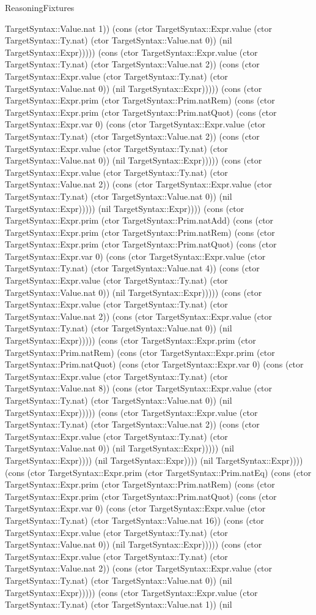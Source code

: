 \begin{lexlean}{ReasoningFixtures}
\begin{semanticmodule}
{TargetSyntax::Value.nat 1)) (cons (ctor TargetSyntax::Expr.value (ctor TargetSyntax::Ty.nat) (ctor TargetSyntax::Value.nat 0)) (nil TargetSyntax::Expr))))) (cons (ctor TargetSyntax::Expr.value (ctor TargetSyntax::Ty.nat) (ctor TargetSyntax::Value.nat 2)) (cons (ctor TargetSyntax::Expr.value (ctor TargetSyntax::Ty.nat) (ctor TargetSyntax::Value.nat 0)) (nil TargetSyntax::Expr))))) (cons (ctor TargetSyntax::Expr.prim (ctor TargetSyntax::Prim.natRem) (cons (ctor TargetSyntax::Expr.prim (ctor TargetSyntax::Prim.natQuot) (cons (ctor TargetSyntax::Expr.var 0) (cons (ctor TargetSyntax::Expr.value (ctor TargetSyntax::Ty.nat) (ctor TargetSyntax::Value.nat 2)) (cons (ctor TargetSyntax::Expr.value (ctor TargetSyntax::Ty.nat) (ctor TargetSyntax::Value.nat 0)) (nil TargetSyntax::Expr))))) (cons (ctor TargetSyntax::Expr.value (ctor TargetSyntax::Ty.nat) (ctor TargetSyntax::Value.nat 2)) (cons (ctor TargetSyntax::Expr.value (ctor TargetSyntax::Ty.nat) (ctor TargetSyntax::Value.nat 0)) (nil TargetSyntax::Expr))))) (nil TargetSyntax::Expr)))) (cons (ctor TargetSyntax::Expr.prim (ctor TargetSyntax::Prim.natAdd) (cons (ctor TargetSyntax::Expr.prim (ctor TargetSyntax::Prim.natRem) (cons (ctor TargetSyntax::Expr.prim (ctor TargetSyntax::Prim.natQuot) (cons (ctor TargetSyntax::Expr.var 0) (cons (ctor TargetSyntax::Expr.value (ctor TargetSyntax::Ty.nat) (ctor TargetSyntax::Value.nat 4)) (cons (ctor TargetSyntax::Expr.value (ctor TargetSyntax::Ty.nat) (ctor TargetSyntax::Value.nat 0)) (nil TargetSyntax::Expr))))) (cons (ctor TargetSyntax::Expr.value (ctor TargetSyntax::Ty.nat) (ctor TargetSyntax::Value.nat 2)) (cons (ctor TargetSyntax::Expr.value (ctor TargetSyntax::Ty.nat) (ctor TargetSyntax::Value.nat 0)) (nil TargetSyntax::Expr))))) (cons (ctor TargetSyntax::Expr.prim (ctor TargetSyntax::Prim.natRem) (cons (ctor TargetSyntax::Expr.prim (ctor TargetSyntax::Prim.natQuot) (cons (ctor TargetSyntax::Expr.var 0) (cons (ctor TargetSyntax::Expr.value (ctor TargetSyntax::Ty.nat) (ctor TargetSyntax::Value.nat 8)) (cons (ctor TargetSyntax::Expr.value (ctor TargetSyntax::Ty.nat) (ctor TargetSyntax::Value.nat 0)) (nil TargetSyntax::Expr))))) (cons (ctor TargetSyntax::Expr.value (ctor TargetSyntax::Ty.nat) (ctor TargetSyntax::Value.nat 2)) (cons (ctor TargetSyntax::Expr.value (ctor TargetSyntax::Ty.nat) (ctor TargetSyntax::Value.nat 0)) (nil TargetSyntax::Expr))))) (nil TargetSyntax::Expr)))) (nil TargetSyntax::Expr)))) (nil TargetSyntax::Expr)))) (cons (ctor TargetSyntax::Expr.prim (ctor TargetSyntax::Prim.natEq) (cons (ctor TargetSyntax::Expr.prim (ctor TargetSyntax::Prim.natRem) (cons (ctor TargetSyntax::Expr.prim (ctor TargetSyntax::Prim.natQuot) (cons (ctor TargetSyntax::Expr.var 0) (cons (ctor TargetSyntax::Expr.value (ctor TargetSyntax::Ty.nat) (ctor TargetSyntax::Value.nat 16)) (cons (ctor TargetSyntax::Expr.value (ctor TargetSyntax::Ty.nat) (ctor TargetSyntax::Value.nat 0)) (nil TargetSyntax::Expr))))) (cons (ctor TargetSyntax::Expr.value (ctor TargetSyntax::Ty.nat) (ctor TargetSyntax::Value.nat 2)) (cons (ctor TargetSyntax::Expr.value (ctor TargetSyntax::Ty.nat) (ctor TargetSyntax::Value.nat 0)) (nil TargetSyntax::Expr))))) (cons (ctor TargetSyntax::Expr.value (ctor TargetSyntax::Ty.nat) (ctor TargetSyntax::Value.nat 1)) (nil }
\end{semanticmodule}
\end{lexlean}
